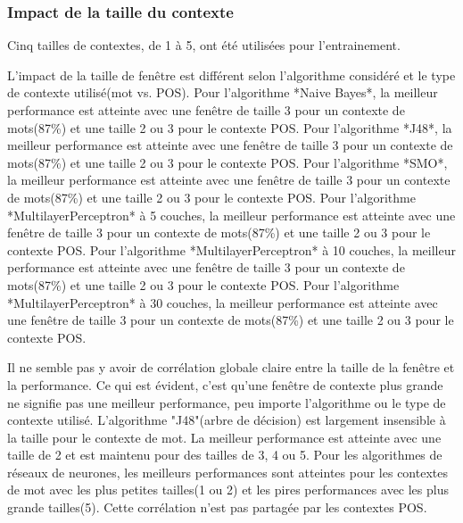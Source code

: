 \documentclass[11pt]{article} %
\begin{document}
\subsubsection{Impact de la taille du contexte}

Cinq tailles de contextes, de 1 à 5, ont été utilisées pour l'entrainement. 

L'impact de la taille de fenêtre est différent selon l'algorithme considéré et le type de contexte utilisé(mot vs. POS).
Pour l'algorithme *Naive Bayes*, la meilleur performance est atteinte avec une fenêtre de taille 3 pour un contexte de mots(87\%) et une taille 2 ou 3 pour le contexte POS.
Pour l'algorithme *J48*, la meilleur performance est atteinte avec une fenêtre de taille 3 pour un contexte de mots(87\%) et une taille 2 ou 3 pour le contexte POS.
Pour l'algorithme *SMO*, la meilleur performance est atteinte avec une fenêtre de taille 3 pour un contexte de mots(87\%) et une taille 2 ou 3 pour le contexte POS.
Pour l'algorithme *MultilayerPerceptron* à 5 couches, la meilleur performance est atteinte avec une fenêtre de taille 3 pour un contexte de mots(87\%) et une taille 2 ou 3 pour le contexte POS.
Pour l'algorithme *MultilayerPerceptron* à 10 couches, la meilleur performance est atteinte avec une fenêtre de taille 3 pour un contexte de mots(87\%) et une taille 2 ou 3 pour le contexte POS.
Pour l'algorithme *MultilayerPerceptron* à 30 couches, la meilleur performance est atteinte avec une fenêtre de taille 3 pour un contexte de mots(87\%) et une taille 2 ou 3 pour le contexte POS.

Il ne semble pas y avoir de corrélation globale claire entre la taille de la fenêtre et la performance. 
Ce qui est évident, c'est qu'une fenêtre de contexte plus grande ne signifie pas une meilleur performance, 
peu importe l'algorithme ou le type de contexte utilisé. 
L'algorithme "J48"(arbre de décision) est largement insensible à la taille pour le contexte de mot. 
La meilleur performance est atteinte avec une taille de 2 et est maintenu pour des tailles de 3, 4 ou 5.
Pour les algorithmes de réseaux de neurones, les meilleurs performances sont atteintes pour les contextes de mot avec les plus petites tailles(1 ou 2) et les pires performances avec les plus grande tailles(5).
Cette corrélation n'est pas partagée par les contextes POS.
\end{document}

